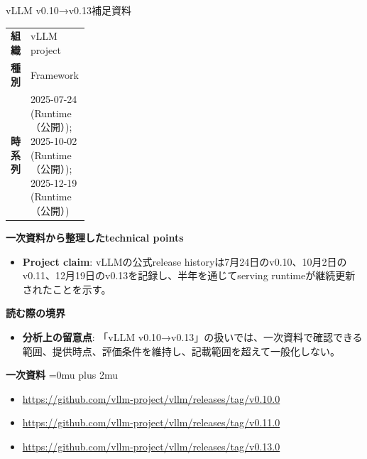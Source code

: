 \begin{technicalnote}{vLLM v0.10→v0.13}{補足資料}
\begingroup
\begin{tabularx}{\linewidth}{@{}>{\bfseries}p{0.22\linewidth}X@{}}
組織 & vLLM project \\
種別 & Framework \\
時系列 & 2025-07-24 (Runtime（公開）); 2025-10-02 (Runtime（公開）); 2025-12-19 (Runtime（公開）) \\
\end{tabularx}
\smallskip
{\bfseries 一次資料から整理したtechnical points}
\begin{itemize}[leftmargin=1.5em,itemsep=0.35em]
\item \textbf{Project claim}: vLLMの公式release historyは7月24日のv0.10、10月2日のv0.11、12月19日のv0.13を記録し、半年を通じてserving runtimeが継続更新されたことを示す。
\end{itemize}
\begin{minipage}{\linewidth}
{\bfseries 読む際の境界}
\begin{itemize}[leftmargin=1.5em,itemsep=0.35em]
\item \textbf{分析上の留意点}: 「vLLM v0.10→v0.13」の扱いでは、一次資料で確認できる範囲、提供時点、評価条件を維持し、記載範囲を超えて一般化しない。
\end{itemize}
\begin{samepage}
{\bfseries 一次資料}
\begingroup\sloppy
\Urlmuskip=0mu plus 2mu\relax
\begin{itemize}[leftmargin=1.5em,itemsep=0.25em]
\item {\scriptsize\url{https://github.com/vllm-project/vllm/releases/tag/v0.10.0}}
\item {\scriptsize\url{https://github.com/vllm-project/vllm/releases/tag/v0.11.0}}
\item {\scriptsize\url{https://github.com/vllm-project/vllm/releases/tag/v0.13.0}}
\end{itemize}
\endgroup
\end{samepage}
\end{minipage}
\endgroup
\end{technicalnote}
\medskip

